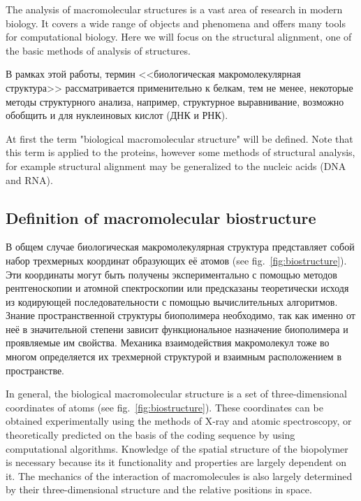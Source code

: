 \documentclass[a4paper, 12pt, titlepage, utf8]{extarticle}
\newenvironment{myfigure}[2]%
{\pushQED{\caption{#1} \label{#2}} %
    \begin{figure}[h!tb]\centering } %
{  \popQED %
    \end{figure}}
\newcommand{\includefigure}[3][]{
\begin{myfigure}{#2}{fig:#3}
    \texttt{[image: \#3]}
\end{myfigure}
}
\newcommand{\lookat}[1]{see fig.~\ref{#1}}
\begin{document}
The analysis of macromolecular structures is a vast area of research in modern
biology. It covers a wide range of objects and phenomena and offers many tools
for computational biology. Here we will focus on the structural alignment, one
of the basic methods of analysis of structures.

\begin{original}
В рамках этой работы, термин <<биологическая макромолекулярная структура>>
рассматривается применительно к белкам, тем не менее, некоторые методы
структурного анализа, например, структурное выравнивание, возможно обобщить и
для нуклеиновых кислот (ДНК и РНК).
\end{original}

At first the term "biological macromolecular structure" will be defined. Note
that this term is applied to the proteins, however some methods of structural
analysis, for example structural alignment may be generalized to the nucleic
acids (DNA and RNA).

\subsection{Definition of macromolecular biostructure}
\begin{original}
В общем случае биологическая макромолекулярная структура представляет собой
набор трехмерных координат образующих её атомов (\lookat{fig:biostructure}).
Эти координаты могут быть получены экспериментально с помощью методов
рентгеноскопии и атомной спектроскопии или предсказаны теоретически исходя из
кодирующей последовательности с помощью вычислительных алгоритмов. Знание
пространственной структуры биополимера необходимо, так как именно от неё в
значительной степени зависит функциональное назначение биополимера и проявляемые
им свойства. Механика взаимодействия макромолекул тоже во многом определяется их
трехмерной структурой и взаимным расположением в пространстве.

\end{original}

In general, the biological macromolecular structure is a set of
three-dimensional coordinates of atoms (\lookat{fig:biostructure}). These
coordinates can be obtained experimentally using the methods of X-ray and atomic
spectroscopy, or theoretically predicted on the basis of the coding sequence by
using computational algorithms. Knowledge of the spatial structure of the
biopolymer is necessary because its it functionality and properties are largely
dependent on it. The mechanics of the interaction of macromolecules is also
largely determined by their three-dimensional structure and the relative
positions in space.
\end{document}
